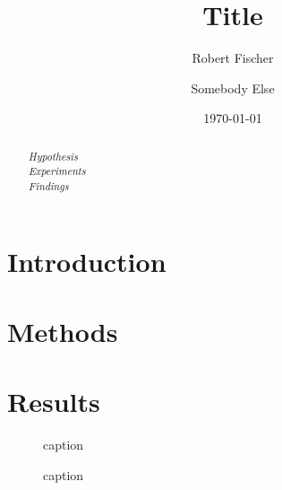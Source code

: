 \documentclass{article}
\begin{document}
	
\title{Title}
\author[1]{Robert Fischer}
\author[2]{Somebody Else}


\date{\today}
\maketitle

\begin{abstract}
		
\textit{Hypothesis}\\


\textit{Experiments}\\


\textit{Findings}\\


\end{abstract}

\section{Introduction}




\section{Methods}

 

\section{Results}

\begin{figure}
	\centering
	\caption{caption}
	\label{fig:refkey}
\end{figure}

\begin{figure}
	\centering
	\caption{caption}
	\label{fig:example}
\end{figure}
\end{document}
